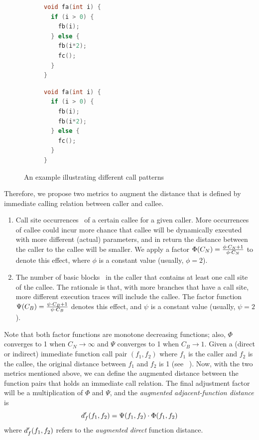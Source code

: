 \begin{figure}[t]
    \centering
\begin{subfigure}[b]{0.36\columnwidth}
\begin{lstlisting}[language=c]
void fa(int i) {
  if (i > 0) {
    fb(i);
  } else {
    fb(i*2);
    fc();
  }
}
\end{lstlisting}  
\caption{}
\label{subfig:dist1}      
\end{subfigure}
\hspace{0.1in}
\centering
\begin{subfigure}[b]{0.36\columnwidth}
\begin{lstlisting}[language=c]        
void fa(int i) {
  if (i > 0) {
    fb(i);
    fb(i*2);
  } else {
    fc();
  }
}        
\end{lstlisting}
\caption{}
\label{subfig:dist2}      
\end{subfigure}
\caption{An example illustrating different call patterns}
\label{figure:dists}
\end{figure}

Therefore, we propose two metrics to augment the distance that is defined by immediate calling relation between caller and callee.
\begin{enumerate}[(1)] 
\item Call site occurrences \csnum~of a certain callee for a given caller. More occurrences of callee could incur more chance that callee will be dynamically executed with more different (actual) parameters, and in return the distance between the caller to the callee will be smaller. We apply a factor $\Phi(C_N)=\frac{\phi\cdot C_N+1}{\phi\cdot C_N}$ to denote this effect, where $\phi$ is a constant value (usually, $\phi=2$).
\item The number of basic blocks \csbb~in the caller that contains at least one call site of the callee. The rationale is that, with more branches that have a call site, more different execution traces will include the callee. The factor function $\Psi(C_B)=\frac{\psi\cdot C_B+1}{\psi\cdot C_B}$ denotes this effect, and $\psi$ is a constant value (usually, $\psi=2$).
\end{enumerate}

Note that both factor functions are monotone decreasing functions; also, $\Phi$ converges to 1 when $C_N\rightarrow\infty$ and $\Psi$ converges to 1 when $C_B\rightarrow 1$.
Given a (direct or indirect) immediate function call pair $( f_1, f_2)$ where $f_1$ is the caller and $f_2$ is the callee, the original distance between $f_1$ and $f_2$ is 1 (see \aflgo~\cite{Bohme:2017:DGF}). Now, with the two metrics mentioned above, we can define the augmented distance between the function pairs that holds an immediate call relation. The final adjustment factor will be a multiplication of $\Phi$ and $\Psi$, and the \emph{augmented adjacent-function distance} is
\begin{equation}
 d^{\prime}_f(f_1,f_2) =  \Psi(f_1, f_2)\cdot\Phi(f_1, f_2)
\end{equation}
where $d^{\prime}_f(f_1,f_2)$ refers to the \emph{augmented} \emph{direct} function distance. 

